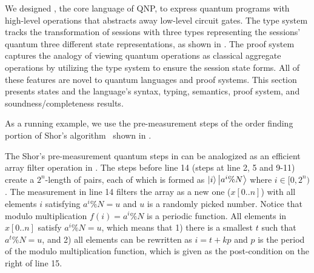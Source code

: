 We designed \qafny, the core language of QNP,
to express quantum programs with
high-level operations that abstracts away low-level circuit gates.
The \qafny type system tracks the transformation of sessions
with three types representing the sessions' quantum three different state representations, as shown in .
The \qafny proof system captures the analogy of viewing quantum 
operations as classical aggregate operations 
by utilizing the type system to ensure the session state forms.
All of these features are novel to quantum languages and proof systems. 
This section presents \qafny states and the language's syntax, typing, 
semantics, proof system, and soundness/completeness results.  

As a running example, we use the pre-measurement steps of the order finding portion of Shor's algorithm~\cite{Shor94} shown in . 
The Shor's pre-measurement quantum steps in  can be analogized as an efficient array filter operation in .
The steps before line 14 (steps at line 2, 5 and 9-11) create a $2^n$-length of pairs, each of which is formed as $\left\vert{i}\right\rangle\left\vert{a^i \% N}\right\rangle$ where $i\in [0,2^n)$. The measurement in line 14 filters the array as a new one ($x[0..n]$) with all elements $i$ satisfying $a^i \% N=u$ and $u$ is a randomly picked number. Notice that modulo multiplication $f(i)=a^i\%N$ is a periodic function. All elements in $x[0..n]$ satisfy $a^i \% N=u$, which means that 1) there is a smallest $t$ such that $a^t \% N=u$, and 2) all elements can be rewritten as $i=t+kp$ and $p$ is the period of the modulo multiplication function, which is given as the post-condition on the right of line 15.
